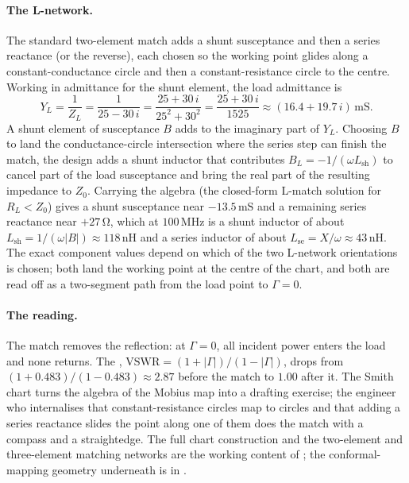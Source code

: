 \paragraph{The L-network.} The standard two-element match adds a shunt
susceptance and then a series reactance (or the reverse), each chosen so
the working point glides along a constant-conductance circle and then a
constant-resistance circle to the centre. Working in admittance for the
shunt element, the load admittance is
\[
Y_{L} = \frac{1}{Z_{L}} = \frac{1}{25 - 30\,i}
= \frac{25 + 30\,i}{25^{2} + 30^{2}}
= \frac{25 + 30\,i}{1525}
\approx (16.4 + 19.7\,i)\,\si{\milli\siemens}.
\]
A shunt element of susceptance $B$ adds to the imaginary part of $Y_{L}$.
Choosing $B$ to land the conductance-circle intersection where the series
step can finish the match, the design adds a shunt inductor that
contributes $B_{L} = -1/(\omega L_{\text{sh}})$ to cancel part of the
load susceptance and bring the real part of the resulting impedance to
$Z_{0}$. Carrying the algebra (the closed-form L-match solution for
$R_{L} < Z_{0}$) gives a shunt susceptance near $-13.5\,\si{\milli
\siemens}$ and a remaining series reactance near $+27\,\si{\ohm}$, which
at $100\,\si{\mega\hertz}$ is a shunt inductor of about
$L_{\text{sh}} = 1/(\omega |B|) \approx 118\,\si{\nano\henry}$ and a
series inductor of about $L_{\text{se}} = X/\omega \approx 43\,\si
{\nano\henry}$. The exact component values depend on which of the two
L-network orientations is chosen; both land the working point at the
centre of the chart, and both are read off as a two-segment path from
the load point to $\Gamma = 0$.

\paragraph{The reading.} The match removes the reflection: at
$\Gamma = 0$, all incident power enters the load and none returns. The
, $\text{VSWR} = (1 + |\Gamma|)/(1 -
|\Gamma|)$, drops from $(1 + 0.483)/(1 - 0.483) \approx 2.87$ before the
match to $1.00$ after it. The Smith chart turns the algebra of the Mobius
map into a drafting exercise; the engineer who internalises that
constant-resistance circles map to circles and that adding a series
reactance slides the point along one of them does the match with a
compass and a straightedge. The full chart construction and the
two-element and three-element matching networks are the working content
of \cite[chapter 2]{text:pozar-microwave}; the conformal-mapping
geometry underneath is in \cite[chapter 6]{text:v2ch03-needham-visual-complex}.

